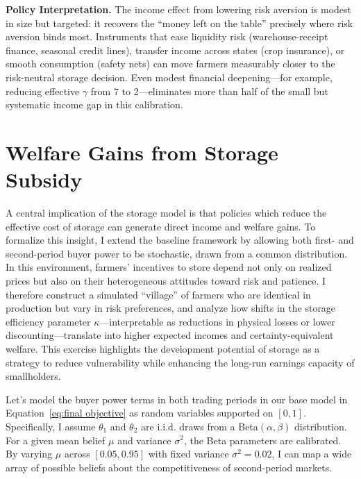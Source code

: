 \textbf{Policy Interpretation.} The income effect from lowering risk aversion is modest in size but targeted: it recovers the ``money left on the table'' precisely where risk aversion binds most. Instruments that ease liquidity risk (warehouse-receipt finance, seasonal credit lines), transfer income across states (crop insurance), or smooth consumption (safety nets) can move farmers measurably closer to the risk-neutral storage decision. Even modest financial deepening---for example, reducing effective $\gamma$ from 7 to 2---eliminates more than half of the small but systematic income gap in this calibration.










\section{Welfare Gains from Storage Subsidy}
\noindent
A central implication of the storage model is that policies which reduce the effective cost of storage can generate direct income and welfare gains. To formalize this insight, I extend the baseline framework by allowing both first- and second-period buyer power to be stochastic, drawn from a common distribution. In this environment, farmers’ incentives to store depend not only on realized prices but also on their heterogeneous attitudes toward risk and patience. I therefore construct a simulated “village” of farmers who are identical in production but vary in risk preferences, and analyze how shifts in the storage efficiency parameter $\kappa$---interpretable as reductions in physical losses or lower discounting---translate into higher expected incomes and certainty-equivalent welfare. This exercise highlights the development potential of storage as a strategy to reduce vulnerability while enhancing the long-run earnings capacity of smallholders.


Let's model the buyer power terms in both trading periods in our base model in Equation~\ref{eq:final objective} as random variables supported on $[0,1]$. Specifically, I assume $\theta_1$ and $\theta_2$ are i.i.d. draws from a Beta$(\alpha,\beta)$ distribution. For a given mean belief $\mu$ and variance $\sigma^2$, the Beta parameters are calibrated. By varying $\mu$ across $[0.05,0.95]$ with fixed variance $\sigma^2=0.02$, I can map a wide array of possible beliefs about the competitiveness of second-period markets.


